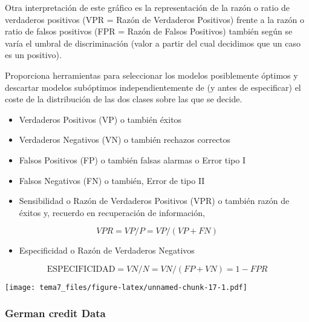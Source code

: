 \documentclass[]{article}
\def\tightlist{}
\newenvironment{Shaded}{\begin{snugshade}}{\end{snugshade}}
\newcommand{\KeywordTok}[1]{\textcolor[rgb]{0.13,0.29,0.53}{\textbf{{#1}}}}
\newcommand{\NormalTok}[1]{{#1}}
\numberwithin{equation}{section}
\begin{document}
Otra interpretación de este gráfico es la representación de la razón o
ratio de verdaderos positivos (VPR = Razón de Verdaderos Positivos)
frente a la razón o ratio de falsos positivos (FPR = Razón de Falsos
Positivos) también según se varía el umbral de discriminación (valor a
partir del cual decidimos que un caso es un positivo).

Proporciona herramientas para seleccionar los modelos posiblemente
óptimos y descartar modelos subóptimos independientemente de (y antes de
especificar) el coste de la distribución de las dos clases sobre las que
se decide.

\begin{itemize}
\item
  Verdaderos Positivos (VP) o también éxitos
\item
  Verdaderos Negativos (VN) o también rechazos correctos
\item
  Falsos Positivos (FP) o también falsas alarmas o Error tipo I
\item
  Falsos Negativos (FN) o también, Error de tipo II
\item
  Sensibilidad o Razón de Verdaderos Positivos (VPR) o también razón de
  éxitos y, recuerdo en recuperación de información,
\end{itemize}

\[
VPR=VP/P=VP/(VP+FN)
\]

\begin{itemize}
\tightlist
\item
  Especificidad o Razón de Verdaderos Negativos
\end{itemize}

\[
\mbox{ESPECIFICIDAD}=VN/N=VN/(FP+VN)=1-FPR
\]

\begin{Shaded}
\end{Shaded}

\texttt{[image: tema7\_files/figure-latex/unnamed-chunk-17-1.pdf]}

\subsubsection{German credit Data}\label{german-credit-data}
\end{document}
